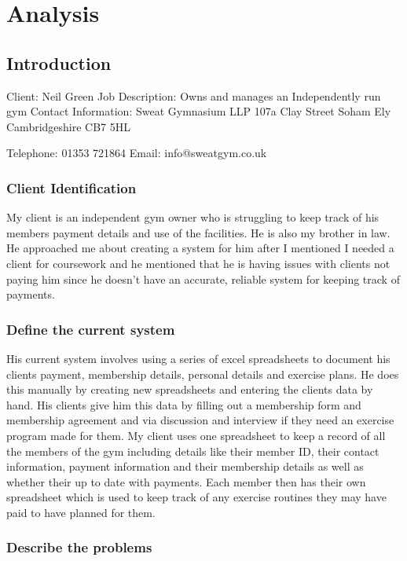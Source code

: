 \chapter{Analysis}

\section{Introduction}

Client: Neil Green
Job Description: Owns and manages an Independently run gym
Contact Information: Sweat Gymnasium LLP
					 107a Clay Street
					 Soham
					 Ely
					 Cambridgeshire
					 CB7 5HL

					 Telephone: 01353 721864
					 Email: info@sweatgym.co.uk

\subsection{Client Identification}

My client is an independent gym owner who is struggling to keep track of his members payment details and use of the facilities. He is also my brother in law. He approached me about creating a system for him after I mentioned I needed a client for coursework and he mentioned that he is having issues with clients not paying him since he doesn't have an accurate, reliable system for keeping track of payments.

\subsection{Define the current system}

His current system involves using a series of excel spreadsheets to document his clients payment, membership details, personal details and exercise plans. He does this manually by creating new spreadsheets and entering the clients data by hand. His clients give him this data by filling out a membership form and membership agreement and via discussion and interview if they need an exercise program made for them. My client uses one spreadsheet to keep a record of all the members of the gym including details like their member ID, their contact information, payment information and their membership details as well as whether their up to date with payments. Each member then has their own spreadsheet which is used to keep track of any exercise routines they may have paid to have planned for them.

\subsection{Describe the problems}


